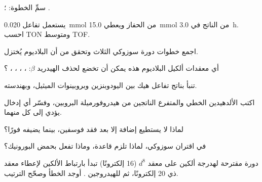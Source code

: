 \begin{exercise}[$\star$]\label{exo:b2:catalytic-cycles:2}
سمِّ الخطوة: ؛ .
\end{exercise}

\begin{exercise}[$\star$]\label{exo:b2:catalytic-cycles:3}
يستعمل تفاعل \qty{0.020}{mmol} من الحفاز ويعطي \qty{15.0}{mmol} من الناتج في
\qty{3.0}{h}. احسب TON ومتوسط TOF.
\end{exercise}

\begin{exercise}[$\star$]\label{exo:b2:catalytic-cycles:4}
اجمع خطوات دورة سوزوكي الثلاث وتحقق من أن البلاديوم يُختزل.
\end{exercise}

\begin{exercise}[$\star\star$]\label{exo:b2:catalytic-cycles:5}
أي معقدات ألكيل البلاديوم هذه يمكن أن تخضع لحذف الهيدريد $\beta$:
، ، ، ، ؟
\end{exercise}

\begin{exercise}[$\star\star$]\label{exo:b2:catalytic-cycles:6}
تنبأ بناتج تفاعل هيك بين اليودوبنزين وبروبينوات الميثيل، وبهندسته.
\end{exercise}

\begin{exercise}[$\star\star$]\label{exo:b2:catalytic-cycles:7}
اكتب الألدهيدين الخطي والمتفرع الناتجين من هيدروفورميلة البروبين، 
وفسّر أي إدخال يؤدي إلى كل منهما.
\end{exercise}

\begin{exercise}[$\star\star$]\label{exo:b2:catalytic-cycles:8}
لماذا لا يستطيع  إضافة  إلا بعد فقد فوسفين، بينما
يضيفه  فورًا؟
\end{exercise}

\begin{exercise}[$\star\star$]\label{exo:b2:catalytic-cycles:9}
في اقتران سوزوكي، لماذا تلزم قاعدة، وماذا تفعل بحمض البورونيك؟
\end{exercise}

\begin{exercise}[$\star\star\star$]\label{exo:b2:catalytic-cycles:10}
دورة مقترحة لهدرجة ألكين على معقد $d^8$  (16 إلكترونًا)
تبدأ بارتباط الألكين لإعطاء معقد ذي 20 إلكترونًا، ثم 
للهيدروجين . أوجد الخطأ وصحّح الترتيب.
\end{exercise}

